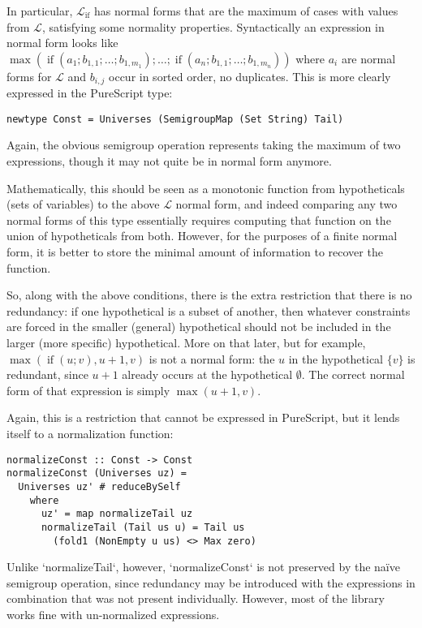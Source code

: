 \documentclass[11pt, twoside, reqno]{book}
\DeclareMathOperator{\ifop}{if}
\begin{document}
In particular, \(\mathcal{L}_{\ifop}\) has normal forms that are the maximum of cases with values from \(\mathcal{L}\), satisfying some normality properties.
Syntactically an expression in normal form looks like\\ \(\max(\ifop(a_1; b_{1,1}; \dots; b_{1,m_1}); \dots; \ifop(a_n; b_{1,1}; \dots; b_{1,m_n}))\) where \(a_i\) are normal forms for \(\mathcal{L}\) and \(b_{i,j}\) occur in sorted order, no duplicates.
This is more clearly expressed in the PureScript type:
\begin{verbatim}
newtype Const = Universes (SemigroupMap (Set String) Tail)
\end{verbatim}
Again, the obvious semigroup operation represents taking the maximum of two expressions, though it may not quite be in normal form anymore.

Mathematically, this should be seen as a monotonic function from hypotheticals (sets of variables) to the above \(\mathcal{L}\) normal form, and indeed comparing any two normal forms of this type essentially requires computing that function on the union of hypotheticals from both.
However, for the purposes of a finite normal form, it is better to store the minimal amount of information to recover the function.

So, along with the above conditions, there is the extra restriction that there is no redundancy: if one hypothetical is a subset of another, then whatever constraints are forced in the smaller (general) hypothetical should not be included in the larger (more specific) hypothetical.
More on that later, but for example, \(\max(\ifop(u; v), u + 1, v)\) is not a normal form: the \(u\) in the hypothetical \(\{v\}\) is redundant, since \(u + 1\) already occurs at the hypothetical \(\emptyset\).
The correct normal form of that expression is simply \(\max(u+1, v)\).

Again, this is a restriction that cannot be expressed in PureScript, but it lends itself to a normalization function:
\begin{verbatim}
normalizeConst :: Const -> Const
normalizeConst (Universes uz) =
  Universes uz' # reduceBySelf
    where
      uz' = map normalizeTail uz
      normalizeTail (Tail us u) = Tail us
        (fold1 (NonEmpty u us) <> Max zero)
\end{verbatim}
Unlike \inHS`normalizeTail`, however, \inHS`normalizeConst` is not preserved by the na\"ive semigroup operation, since redundancy may be introduced with the expressions in combination that was not present individually.
However, most of the library works fine with un-normalized expressions.
\end{document}
